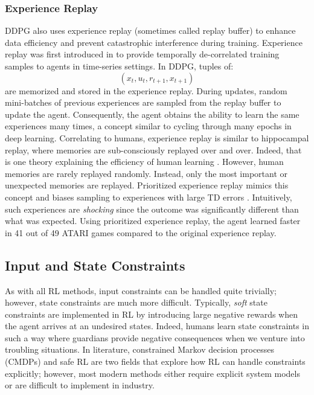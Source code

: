 \subsubsection{Experience Replay}
DDPG also uses experience replay (sometimes called replay buffer) to enhance data efficiency and prevent catastrophic interference during training.  Experience replay was first introduced in \cite{exp_replay} to provide temporally de-correlated training samples to agents in time-series settings. In DDPG, tuples of:
$$(x_t, u_t, r_{t+1}, x_{t+1})$$
are memorized and stored in the experience replay. During updates, random mini-batches of previous experiences are sampled from the replay buffer to update the agent. Consequently, the agent obtains the ability to learn the same experiences many times, a concept similar to cycling through many epochs in deep learning. Correlating to humans, experience replay is similar to hippocampal replay, where memories are sub-consciously replayed over and over.  Indeed, that is one theory explaining the efficiency of human learning \cite{hippocampal}. However, human memories are rarely replayed randomly. Instead, only the most important or unexpected memories are replayed. Prioritized experience replay mimics this concept and biases sampling to experiences with large TD errors \cite{p_exp}. Intuitively, such experiences are \textit{shocking} since the outcome was significantly different than what was expected. Using prioritized experience replay, the agent learned faster in 41 out of 49 ATARI games compared to the original experience replay.

\subsection{Input and State Constraints}
As with all RL methods, input constraints can be handled quite trivially; however, state constraints are much more difficult. Typically, \textit{soft} state constraints are implemented in RL by introducing large negative rewards when the agent arrives at an undesired states. Indeed, humans learn state constraints in such a way where guardians provide negative consequences when we venture into troubling situations.  In literature, constrained Markov decision processes (CMDPs) and safe RL are two fields that explore how RL can handle constraints explicitly; however, most modern methods either require explicit system models or are difficult to implement in industry. 


